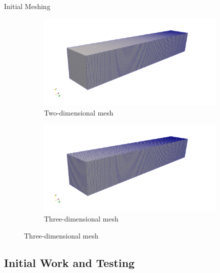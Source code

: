 \begin{frame}{Initial Meshing}
\begin{figure}[]
    \centering
    \begin{subfigure}[]{0.5\textwidth}
        \centering
        \includegraphics[width=\textwidth]{../figs/mesh/2Dmesh.png}
        \caption{Two-dimensional mesh}
    \end{subfigure}%
    \begin{subfigure}[]{0.5\textwidth}
        \centering
        \includegraphics[width=\textwidth]{../figs/mesh/3Dmesh.png}
        \caption{Three-dimensional mesh}
    \end{subfigure}
\end{figure}
\end{frame}

\subsection{Initial Work and Testing}

